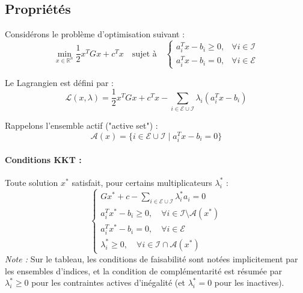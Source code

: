 \subsection{Propriétés}


Considérons le problème d'optimisation suivant :
    \begin{equation}
        \min_{x \in \mathbb{R}^n} \frac{1}{2} x^T G x + c^T x \quad \text{sujet à} \quad
        \begin{cases}
            a_i^T x - b_i \ge 0, & \forall i \in \mathcal{I} \\
            a_i^T x - b_i = 0, & \forall i \in \mathcal{E}
        \end{cases}
    \end{equation}

    Le Lagrangien est défini par :
    \begin{equation}
        \mathcal{L}(x, \lambda) = \frac{1}{2} x^T G x + c^T x - \sum_{i \in \mathcal{E} \cup \mathcal{I}} \lambda_i (a_i^T x - b_i)
    \end{equation}

    Rappelons l'ensemble actif ("active set") :
    \begin{equation}
        \mathcal{A}(x) = \{ i \in \mathcal{E} \cup \mathcal{I} \mid a_i^T x - b_i = 0 \}
    \end{equation}

    \paragraph{Conditions KKT :}
    Toute solution $x^*$ satisfait, pour certains multiplicateurs $\lambda_i^*$ :
    \begin{equation}
        \begin{cases}
            G x^* + c - \sum_{i \in \mathcal{E} \cup \mathcal{I}} \lambda_i^* a_i = 0 \\
            a_i^T x^* - b_i \ge 0, \quad \forall i \in \mathcal{I} \setminus \mathcal{A}(x^*) \\
            a_i^T x^* - b_i = 0, \quad \forall i \in \mathcal{E} \\
            \lambda_i^* \ge 0, \quad \forall i \in \mathcal{I} \cap \mathcal{A}(x^*)
        \end{cases}
    \end{equation}
    \emph{Note :} Sur le tableau, les conditions de faisabilité sont notées implicitement par les ensembles d'indices, et la condition de complémentarité est résumée par $\lambda_i^* \ge 0$ pour les contraintes actives d'inégalité (et $\lambda_i^* = 0$ pour les inactives).

